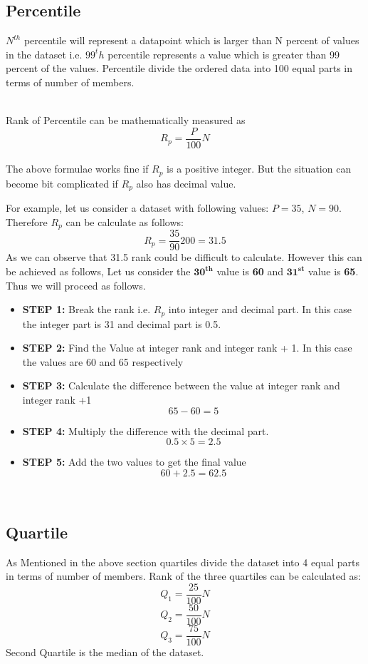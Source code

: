 \documentclass[twoside,12pt]{report}  %
\begin{document}
\subsection{Percentile}
\begin{tcolorbox}[colback=red!5!white, colframe=red!75!black, title = \textbf{Percentile}]
	$N^{th}$ percentile will represent a datapoint which is larger than N percent of values in the dataset i.e. $99^th$ percentile represents a value which is greater than 99 percent of the values. Percentile divide the ordered data into 100 equal parts in terms of number of members.
\end{tcolorbox}
\noindent
\\
Rank of Percentile can be mathematically measured as
$$ R_p = \frac{P}{100}N $$
\noindent
\\
The above formulae works fine if $R_p$ is a positive integer. But the situation can become bit complicated if $R_p$ also has decimal value. 
\begin{tcolorbox}[colback=blue!5!white, colframe=blue!75!black, title = \textbf{Example}]
	For example, let us consider a dataset with following values:
	$P=35$, $N=90$. Therefore $R_p$ can be calculate as follows:
	$$R_p = \frac{35}{90}200 = 31.5$$
	As we can observe that 31.5 rank could be difficult to calculate. However this can be achieved as follows, Let us consider the $\boldsymbol{30^{th}}$ value is \textbf{60} and $\boldsymbol{31^{st}}$ value is \textbf{65}. Thus we will proceed as follows.
	\begin{itemize}
		\item \textbf{STEP 1:} Break the rank i.e. $R_p$ into integer and decimal part. In this case the integer part is 31 and decimal part is 0.5.
		\item \textbf{STEP 2:} Find the Value at integer rank and integer rank + 1. In this case the values are 60 and 65 respectively
		\item \textbf{STEP 3:} Calculate the difference between the value at integer rank and integer rank +1
		$$65 - 60 = 5$$ 
		\item \textbf{STEP 4:} Multiply the difference with the decimal part.
		$$ 0.5 \times  5 = 2.5$$
		\item \textbf{STEP 5:} Add the two values to get the final value
		$$ 60 + 2.5 = 62.5 $$
	\end{itemize}
\end{tcolorbox}
\noindent
\\
\subsection{Quartile}
As Mentioned in the above section quartiles divide the dataset into 4 equal parts in terms of number of members.
Rank of the three quartiles can be calculated as:
$$ Q_1 = \frac{25}{100}N $$
$$ Q_2 = \frac{50}{100}N $$
$$ Q_3 = \frac{75}{100}N $$
Second Quartile is the median of the dataset.
\noindent
\\
\end{document}

